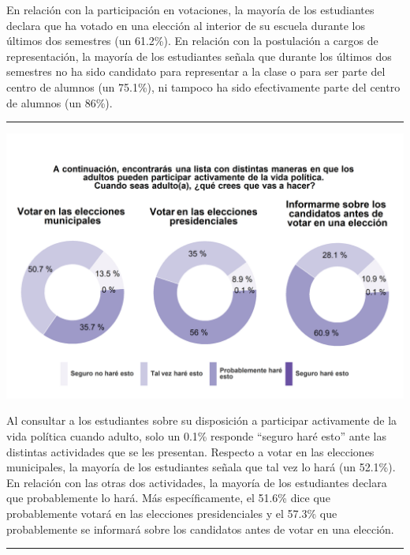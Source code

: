\documentclass[
  14pt,
]{book}
\let\origfigure\figure
\let\endorigfigure\endfigure
\renewenvironment{figure}[1][2] {
  \expandafter\origfigure\expandafter[H]
} {
  \endorigfigure
}
\begin{document}
En relación con la participación en votaciones, la mayoría de los estudiantes declara que ha votado en una elección al interior de su escuela durante los últimos dos semestres (un 61.2\%). En relación con la postulación a cargos de representación, la mayoría de los estudiantes señala que durante los últimos dos semestres no ha sido candidato para representar a la clase o para ser parte del centro de alumnos (un 75.1\%), ni tampoco ha sido efectivamente parte del centro de alumnos (un 86\%).

\begin{center}\rule{0.5\linewidth}{0.5pt}\end{center}

\begin{figure}[!ht]

{\centering \includegraphics[width=0.8\linewidth,]{images/graph_partform_fut} 

}

\caption{Participación formal cuando sea adulto(a)}\label{fig:unnamed-chunk-54}
\end{figure}

Al consultar a los estudiantes sobre su disposición a participar activamente de la vida política cuando adulto, solo un 0.1\% responde ``seguro haré esto'' ante las distintas actividades que se les presentan. Respecto a votar en las elecciones municipales, la mayoría de los estudiantes señala que tal vez lo hará (un 52.1\%). En relación con las otras dos actividades, la mayoría de los estudiantes declara que probablemente lo hará. Más específicamente, el 51.6\% dice que probablemente votará en las elecciones presidenciales y el 57.3\% que probablemente se informará sobre los candidatos antes de votar en una elección.

\begin{center}\rule{0.5\linewidth}{0.5pt}\end{center}
\end{document}
